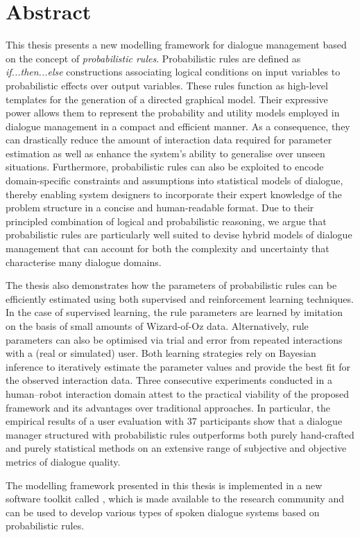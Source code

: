 \chapter*{Abstract}

This thesis presents a new modelling framework for dialogue management based on the concept of \textit{probabilistic rules}.  Probabilistic rules are defined as \textit{if...then...else} constructions associating logical conditions on input variables to probabilistic effects over output variables.  These rules function as high-level templates for the generation of a directed graphical model. Their expressive power allows them to represent the probability and utility models employed in dialogue management in a compact and efficient manner. As a consequence, they can drastically reduce the amount of interaction data required for parameter estimation as well as enhance the system's ability to generalise over unseen situations. Furthermore, probabilistic rules can also be exploited to encode domain-specific constraints and assumptions into statistical models of dialogue, thereby enabling system designers to incorporate their expert knowledge of the problem structure in a concise and human-readable format.  Due to their principled combination  of logical and probabilistic reasoning, we argue that probabilistic rules are particularly well suited to devise hybrid models of dialogue management that can account for both the complexity and uncertainty that characterise many dialogue domains.

The thesis also demonstrates how the parameters of probabilistic rules can be efficiently estimated using both supervised and reinforcement learning techniques. In the case of supervised learning, the rule parameters are learned by imitation on the basis of small amounts of Wizard-of-Oz data.  Alternatively, rule parameters can also be optimised via trial and error from repeated interactions with a (real or simulated) user. Both learning strategies rely on Bayesian inference to iteratively estimate the parameter values and provide the best fit for the observed interaction data. Three consecutive experiments conducted in a human--robot interaction domain attest to the practical viability of the proposed framework and its advantages over traditional approaches.  In particular, the empirical results of a user evaluation with 37 participants show that a dialogue manager structured with probabilistic rules outperforms both purely hand-crafted and purely statistical methods on an extensive range of subjective and objective metrics of dialogue quality.

The modelling framework presented in this thesis is implemented in a new software toolkit called \opendial{}, which is made available to the research community and can be used to develop various types of spoken dialogue systems based on probabilistic rules. 
